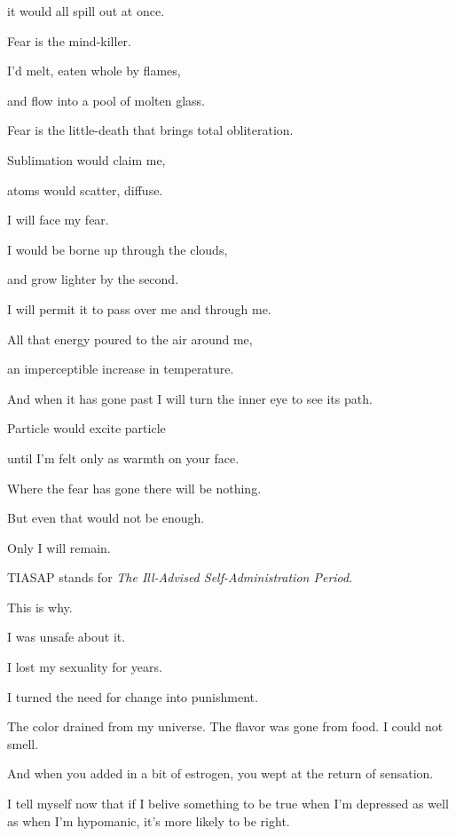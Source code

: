 \begin{paracol}{2}
\begin{leftcolumn}
it would all spill out at once.

\begin{ally}
Fear is the mind-killer.
\end{ally}
I'd melt, eaten whole by flames,

and flow into a pool of molten glass.

\begin{ally}
Fear is the little-death that brings total obliteration.
\end{ally}
Sublimation would claim me,

atoms would scatter, diffuse.

\begin{ally}
I will face my fear.
\end{ally}
I would be borne up through the clouds,

and grow lighter by the second.

\begin{ally}
I will permit it to pass over me and through me.
\end{ally}
All that energy poured to the air around me,

an imperceptible increase in temperature.

\begin{ally}
And when it has gone past I will turn the inner eye to see its path.
\end{ally}
Particle would excite particle

until I'm felt only as warmth on your face.
\newpage
\null
\vfill

\begin{ally}
Where the fear has gone there will be nothing.
\end{ally}
But even that would not be enough.

\begin{ally}
Only I will remain.
\end{ally}
\vfill
\newpage

\noindent TIASAP stands for \emph{The Ill-Advised Self-Administration Period}.

This is why.

I was unsafe about it.

I lost my sexuality for years.

I turned the need for change into punishment.

The color drained from my universe. The flavor was gone from food. I could not smell.

\begin{ally}
And when you added in a bit of estrogen, you wept at the return of sensation.
\end{ally}
I tell myself now that if I belive something to be true when I'm depressed as well as when I'm hypomanic, it's more likely to be right.


\end{leftcolumn}
\end{paracol}
